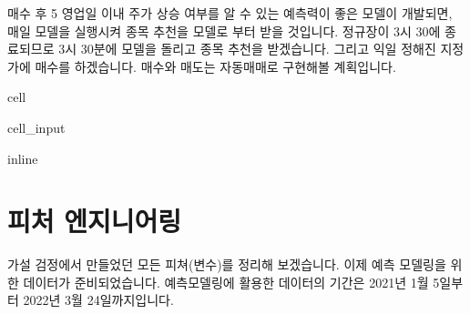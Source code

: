 \documentclass[letterpaper,10pt,english]{jupyterBook}
\begin{document}
\sphinxAtStartPar
매수 후 5 영업일 이내 주가 상승 여부를 알 수 있는 예측력이 좋은 모델이 개발되면, 매일 모델을 실행시켜 종목 추천을 모델로 부터 받을 것입니다. 정규장이 3시 30에 종료되므로 3시 30분에 모델을 돌리고 종목 추천을 받겠습니다. 그리고 익일 정해진 지정가에 매수를 하겠습니다. 매수와 매도는 자동매매로 구현해볼 계획입니다.

\begin{sphinxuseclass}{cell}\begin{sphinxVerbatimInput}

\begin{sphinxuseclass}{cell_input}
\begin{sphinxVerbatim}[commandchars=\\\{\}]
   
 inline
   
   
   

  
\end{sphinxVerbatim}

\end{sphinxuseclass}\end{sphinxVerbatimInput}

\end{sphinxuseclass}

\section{피처 엔지니어링}
\label{\detokenize{chapter5/5.2.1_Feature_Engineering:id1}}\label{\detokenize{chapter5/5.2.1_Feature_Engineering::doc}}
\sphinxAtStartPar
가설 검정에서 만들었던 모든 피쳐(변수)를 정리해 보겠습니다. 이제 예측 모델링을 위한 데이터가 준비되었습니다. 예측모델링에 활용한 데이터의 기간은 2021년 1월 5일부터 2022년 3월 24일까지입니다.
\end{document}
